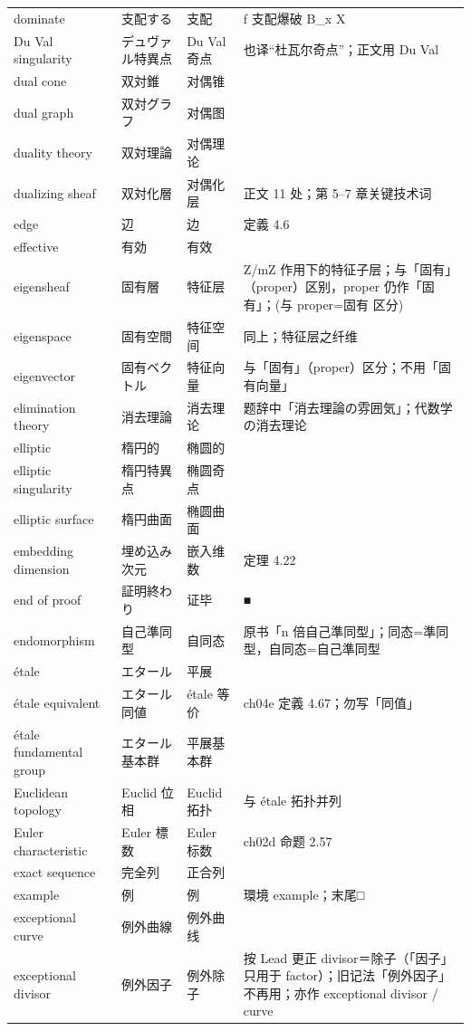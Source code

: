 \begin{longtable}{@{}>{\raggedright\arraybackslash}p{}>{\raggedright\arraybackslash}p{}>{\raggedright\arraybackslash}p{}>{\raggedright\arraybackslash}p{}@{}}
dominate & 支配する & 支配 & f 支配爆破 B\_x X \\
Du Val singularity & デュヴァル特異点 & Du Val 奇点 & 也译“杜瓦尔奇点”；正文用 Du Val \\
dual cone & 双対錐 & 对偶锥 &  \\
dual graph & 双対グラフ & 对偶图 &  \\
duality theory & 双対理論 & 对偶理论 &  \\
dualizing sheaf & 双対化層 & 对偶化层 & 正文 11 处；第 5–7 章关键技术词 \\
edge & 辺 & 边 & 定義 4.6 \\
effective & 有効 & 有效 &  \\
eigensheaf & 固有層 & 特征层 & Z/mZ 作用下的特征子层；与「固有」（proper）区别，proper 仍作「固有」；(与 proper=固有 区分) \\
eigenspace & 固有空間 & 特征空间 & 同上；特征层之纤维 \\
eigenvector & 固有ベクトル & 特征向量 & 与「固有」（proper）区分；不用「固有向量」 \\
elimination theory & 消去理論 & 消去理论 & 题辞中「消去理論の雰囲気」；代数学の消去理论 \\
elliptic & 楕円的 & 椭圆的 & 7.79 \\
elliptic singularity & 楕円特異点 & 椭圆奇点 &  \\
elliptic surface & 楕円曲面 & 椭圆曲面 &  \\
embedding dimension & 埋め込み次元 & 嵌入维数 & 定理 4.22 \\
end of proof & 証明終わり & 证毕 & ■ \\
endomorphism & 自己準同型 & 自同态 & 原书「n 倍自己準同型」；同态=準同型，自同态=自己準同型 \\
étale & エタール & 平展 &  \\
étale equivalent & エタール同値 & étale 等价 & ch04e 定義 4.67；勿写「同值」 \\
étale fundamental group & エタール基本群 & 平展基本群 &  \\
Euclidean topology & Euclid 位相 & Euclid 拓扑 & 与 étale 拓扑并列 \\
Euler characteristic & Euler 標数 & Euler 标数 & ch02d 命题 2.57 \\
exact sequence & 完全列 & 正合列 &  \\
example & 例 & 例 & 環境 example；末尾□ \\
exceptional curve & 例外曲線 & 例外曲线 &  \\
exceptional divisor & 例外因子 & 例外除子 & 按 Lead 更正 divisor＝除子（「因子」只用于 factor）；旧记法「例外因子」不再用；亦作 exceptional divisor / curve \\

\end{longtable}

